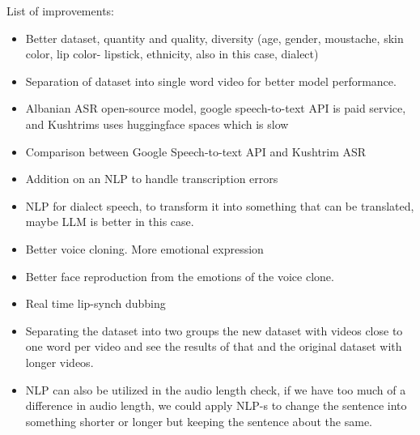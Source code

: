 \documentclass[12pt]{article}
\begin{document}
List of improvements:
\begin{itemize}
    \item Better dataset, quantity and quality, diversity (age, gender, moustache, skin color, lip color- lipstick, ethnicity, also in this case, dialect)
    \item Separation of dataset into single word video for better model performance.
    \item Albanian ASR open-source model, google speech-to-text API is paid service, and Kushtrims uses huggingface spaces which is slow
    \item Comparison between Google Speech-to-text API and Kushtrim ASR
    \item Addition on an NLP to handle transcription errors
    \item NLP for dialect speech, to transform it into something that can be translated, maybe LLM is better in this case.
    \item Better voice cloning. More emotional expression
    \item Better face reproduction from the emotions of the voice clone.
    \item Real time lip-synch dubbing
    \item Separating the dataset into two groups the new dataset with videos close to one word per video and see the results of that and the original dataset with longer videos. 
    \item NLP can also be utilized in the audio length check, if we have too much of a difference in audio length, we could apply NLP-s to change the sentence into something shorter or longer but keeping the sentence about the same.
\end{itemize}



\end{document}

